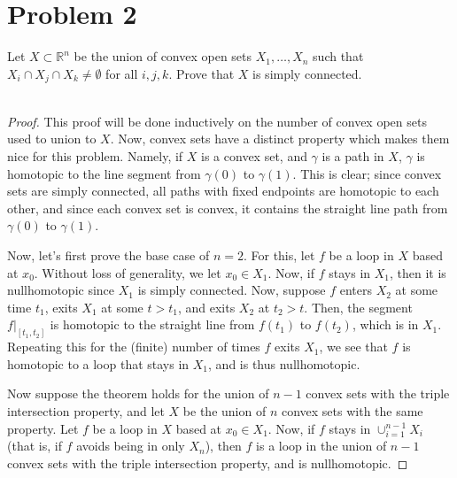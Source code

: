 \documentclass[fontsize=11pt]{scrartcl} %
\numberwithin{equation}{section} %
\numberwithin{figure}{section} %
\numberwithin{table}{section} %
\newcommand{\R}{\mathbb{R}}
\begin{document}
\newpage

\newpage
\section*{Problem 2}
Let $X\subset \R^n$ be the union of convex open sets $X_1,\dots,X_n$ such that
$X_i\cap X_j\cap X_k\neq\emptyset$ for all $i,j,k$. Prove that $X$ is simply
connected.
\\
\\
\begin{proof}
    This proof will be done inductively on the number of convex open sets used
    to union to $X$. Now, convex sets have a distinct property which makes them
    nice for this problem. Namely, if $X$ is a convex set, and $\gamma$ is a
    path in $X$, $\gamma$ is homotopic to the line segment from $\gamma(0)$ to
    $\gamma(1)$. This is clear; since convex sets are simply connected, all
    paths with fixed endpoints are homotopic to each other, and since each
    convex set is convex, it contains the straight line path from $\gamma(0)$ to
    $\gamma(1)$.

    Now, let's first prove the base case of $n=2$. For this, let $f$ be a loop
    in $X$ based at $x_0$. Without loss of generality, we let $x_0\in X_1$. Now,
    if $f$ stays in $X_1$, then it is nullhomotopic since $X_1$ is simply
    connected. Now, suppose $f$ enters $X_2$ at some time $t_1$, exits $X_1$ at
    some $t>t_1$, and exits $X_2$ at $t_2>t$. Then, the segment $f|_{[t_1,t_2]}$
    is homotopic to the straight line from $f(t_1)$ to $f(t_2)$, which is in
    $X_1$. Repeating this for the (finite) number of times $f$ exits $X_1$, we
    see that $f$ is homotopic to a loop that stays in $X_1$, and is thus
    nullhomotopic.

    Now suppose the theorem holds for the union of $n-1$ convex sets with the
    triple intersection property, and let $X$ be the union of $n$ convex sets
    with the same property. Let $f$ be a loop in $X$ based at $x_0\in X_1$. Now,
    if $f$ stays in $\cup_{i=1}^{n-1}X_i$ (that is, if $f$ avoids being in only
    $X_n$), then $f$ is a loop in the union of $n-1$ convex sets with the triple
    intersection property, and is nullhomotopic. 
    

\end{proof}
\end{document}
